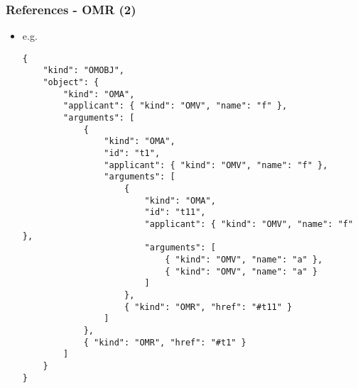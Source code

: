 \documentclass[usenames,dvipsnames]{beamer}
\begin{document}
\begin{frame}[fragile]
    \frametitle{References - OMR (2)}
    \begin{itemize}
        \item e.g.
\begin{lstlisting}
{
    "kind": "OMOBJ",
    "object": {
        "kind": "OMA",
        "applicant": { "kind": "OMV", "name": "f" },
        "arguments": [
            {
                "kind": "OMA",
                "id": "t1",
                "applicant": { "kind": "OMV", "name": "f" },
                "arguments": [
                    {
                        "kind": "OMA",
                        "id": "t11",
                        "applicant": { "kind": "OMV", "name": "f" },
                        "arguments": [
                            { "kind": "OMV", "name": "a" },
                            { "kind": "OMV", "name": "a" }
                        ]
                    },
                    { "kind": "OMR", "href": "#t11" }
                ]
            },
            { "kind": "OMR", "href": "#t1" }
        ]
    }
}
\end{lstlisting}
    \end{itemize}
\end{frame}


\end{document}
